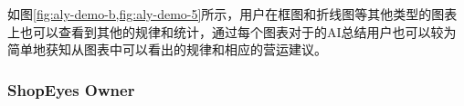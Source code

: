如图\ref{fig:aly-demo-b,fig:aly-demo-5}所示，用户在框图和折线图等其他类型的图表上也可以查看到其他的规律和统计，通过每个图表对于的AI总结用户也可以较为简单地获知从图表中可以看出的规律和相应的营运建议。

\subsubsection{ShopEyes Owner}

\begin{figure}[htbp]
    \centering
    \hfill
    \hfill

\end{figure}
